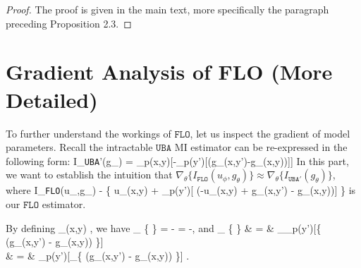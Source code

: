 \documentclass{article}
\theoremstyle{plain}
\theoremstyle{definition}
\theoremstyle{remark}
\newcommand{\UBA}{\texttt{UBA}}
\newcommand{\FLO}{\texttt{FLO}}
\begin{document}
		\begin{proof}
			The proof is given in the main text, more specifically the paragraph preceding Proposition 2.3. 
		\end{proof}
		
		
		\section{Gradient Analysis of FLO (More Detailed)}
		\vspace{-8pt} %
		\label{sec:grad}
		
		To further understand the workings of $\FLO$, let us inspect the gradient of model parameters. Recall the intractable $\UBA$ MI estimator can be re-expressed in the following form:
		\beq
		I_{\UBA'}(g_\theta) = \EE_{p(x,y)}[-\log \EE_{p(y')}[\exp(g_{\theta}(x,y')-g_{\theta}(x,y))]]
		\eeq
		In this part, we want to establish the intuition that $\nabla_{\theta}\{ I_{\FLO}(u_\phi, g_\theta) \} \approx  \nabla_{\theta} \{I_{\UBA'}(g_\theta)\}$, where 
		\beq
		I_{\FLO}(u_{\phi},g_{\theta}) \triangleq - \left\{ u_{\phi}(x,y) + \EE_{p(y')}[ \exp(-u_{\phi}(x,y) + g_{\theta}(x,y') - g_{\theta}(x,y))] \right\}
		\eeq
		is our $\FLO$ estimator. 
		
		
		By defining
		\beq
		\CE_{\theta}(x,y) \triangleq {}, 
		\eeq
		we have
		\beq
		\nabla_{\theta} \left\{  \right\} = -  = -,  
		\eeq
		and 
		\beqs
		\nabla_{\theta} \left\{  \right\} & = & \nabla_{\theta}\EE_{p(y')}[\left\{ \exp(g_{\theta}(x,y') - g_{\theta}(x,y)) \right\}] \\
		& = & \EE_{p(y')}[\nabla_{\theta}\left\{ \exp(g_{\theta}(x,y') - g_{\theta}(x,y)) \right\}] .
		\eeqs
		
\end{document}
